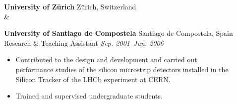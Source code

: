 \documentclass[letterpaper]{article}
\begin{document}
\begin{description}
\item[] \textbf{University of Z\"urich} \hfill Z\"urich, Switzerland \\
 \&
\item[] \vspace*{-2.5ex} \textbf{University of Santiago de Compostela} \hfill Santiago de Compostela, Spain\\
    Research \& Teaching Assistant \hfill \textit{Sep. 2001--Jun. 2006}
\vspace*{-0.2cm}
\begin{itemize}
\item   Contributed to the design and development and carried out performance studies of the silicon microstrip detectors installed in the Silicon Tracker of the LHCb experiment at CERN.
\item Trained and supervised undergraduate students. 
\end{itemize} 
\end{description}
\end{document}
